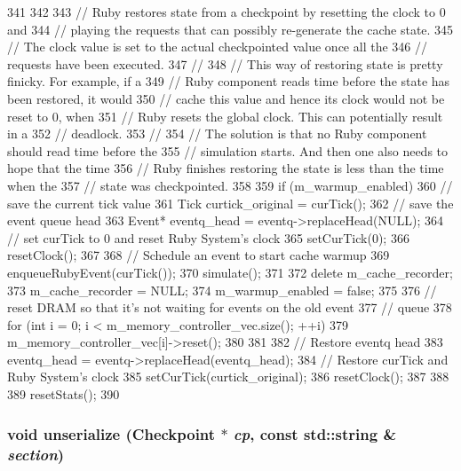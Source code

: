 \begin{DoxyCode}
341 {
342 
343     // Ruby restores state from a checkpoint by resetting the clock to 0 and
344     // playing the requests that can possibly re-generate the cache state.
345     // The clock value is set to the actual checkpointed value once all the
346     // requests have been executed.
347     //
348     // This way of restoring state is pretty finicky. For example, if a
349     // Ruby component reads time before the state has been restored, it would
350     // cache this value and hence its clock would not be reset to 0, when
351     // Ruby resets the global clock. This can potentially result in a
352     // deadlock.
353     //
354     // The solution is that no Ruby component should read time before the
355     // simulation starts. And then one also needs to hope that the time
356     // Ruby finishes restoring the state is less than the time when the
357     // state was checkpointed.
358 
359     if (m_warmup_enabled) {
360         // save the current tick value
361         Tick curtick_original = curTick();
362         // save the event queue head
363         Event* eventq_head = eventq->replaceHead(NULL);
364         // set curTick to 0 and reset Ruby System's clock
365         setCurTick(0);
366         resetClock();
367 
368         // Schedule an event to start cache warmup
369         enqueueRubyEvent(curTick());
370         simulate();
371 
372         delete m_cache_recorder;
373         m_cache_recorder = NULL;
374         m_warmup_enabled = false;
375 
376         // reset DRAM so that it's not waiting for events on the old event
377         // queue
378         for (int i = 0; i < m_memory_controller_vec.size(); ++i) {
379             m_memory_controller_vec[i]->reset();
380         }
381 
382         // Restore eventq head
383         eventq_head = eventq->replaceHead(eventq_head);
384         // Restore curTick and Ruby System's clock
385         setCurTick(curtick_original);
386         resetClock();
387     }
388 
389     resetStats();
390 }
\end{DoxyCode}
\hypertarget{classRubySystem_af22e5d6d660b97db37003ac61ac4ee49}{
\subsubsection[{unserialize}]{\setlength{\rightskip}{0pt plus 5cm}void unserialize ({\bf Checkpoint} $\ast$ {\em cp}, \/  const std::string \& {\em section})}}
\label{classRubySystem_af22e5d6d660b97db37003ac61ac4ee49}


